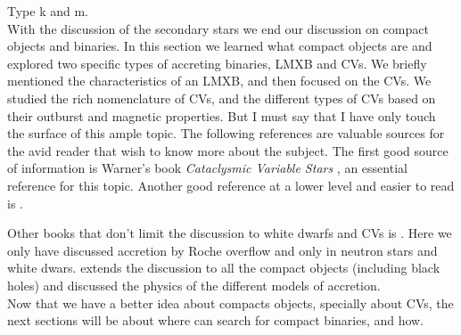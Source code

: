 Type k and m. \\



With the discussion of the secondary stars we end our discussion on compact objects and binaries. In this section we learned what compact objects are and explored two specific types of accreting binaries, LMXB and CVs. We briefly mentioned the characteristics of an LMXB, and then focused on the CVs. We studied the rich nomenclature of CVs, and the different types of CVs based on their outburst and magnetic properties. But I must say that I have only touch the surface of this ample topic. The following references are valuable sources for the avid reader that wish to know more about the subject. The first good source of information is Warner's book \emph{Cataclysmic Variable Stars} \citep{warner_cataclysmic_2003}, an essential reference for this topic. Another good reference at a lower level and easier to read is \cite{hellier_cataclysmic_2001}. 

Other books that don't limit the discussion to white dwarfs and CVs is \cite{frank_accretion_2002}. Here we only have discussed accretion by Roche overflow and only in neutron stars and white dwars. \cite{frank_accretion_2002} extends the discussion to all the compact objects (including black holes) and discussed the physics of the different models of accretion. \\ 

Now that we have a better idea about compacts objects, specially about CVs, the next sections will be about where can search for compact binaries, and how. \\ 

